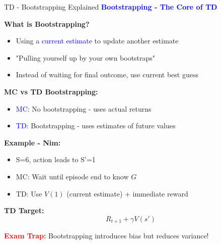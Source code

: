 \documentclass[8pt]{beamer}
\begin{document}
	\begin{frame}{TD - Bootstrapping Explained}
		\fontsize{6.5}{7.5}\selectfont
		\textcolor{blue}{\textbf{Bootstrapping - The Core of TD}}
		
		\textbf{What is Bootstrapping?}
		\begin{itemize}
			\item Using a \textcolor{blue}{current estimate} to update another estimate
			\item "Pulling yourself up by your own bootstraps"
			\item Instead of waiting for final outcome, use current best guess
		\end{itemize}
		
		\textbf{MC vs TD Bootstrapping:}
		\begin{itemize}
			\item \textcolor{blue}{MC}: No bootstrapping - uses actual returns
			\item \textcolor{blue}{TD}: Bootstrapping - uses estimates of future values
		\end{itemize}
		
		\textbf{Example - Nim:}
		\begin{itemize}
			\item S=6, action leads to S'=1
			\item MC: Wait until episode end to know $G$
			\item TD: Use $V(1)$ (current estimate) + immediate reward
		\end{itemize}
		
		\textbf{TD Target:}
		\[
		R_{t+1} + \gamma V(s')
		\]
		
		\textcolor{red}{\textbf{Exam Trap:}} Bootstrapping introduces bias but reduces variance!
	\end{frame}
	
\end{document}
